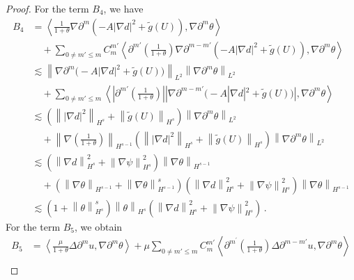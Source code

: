 \documentclass[reqno,11pt]{amsart}
\numberwithin{equation}{section}
\begin{document}
\begin{proof}
For the term $B_4$, we have
\begin{equation}\label{theta-eq5}
\begin{aligned}
B_4 & = \left\langle \frac{1}{1+\theta} \nabla \partial^m \left( - A |\nabla d|^2 + \tilde{g}(U) \right), \nabla \partial^m \theta \right\rangle \\
&\quad  + \sum_{0 \neq m' \leq m} C_m^{m'} \left\langle \partial^{m'} \left( \frac{1}{1+\theta} \right) \nabla \partial^{m - m'} \left( - A |\nabla d|^2 + \tilde{g}(U) \right), \nabla \partial^m \theta \right\rangle\\&
\lesssim \left\|\nabla \partial^m \big(-A|\nabla d|^2 + \tilde{g}(U)\big)\right\|_{L^2} \left\|\nabla \partial^m \theta\right\|_{L^2} \\
&\quad + \sum_{0 \neq m' \leq m} \left\langle \left|\partial^{m'} \left(\frac{1}{1+\theta}\right)\right| |\nabla \partial^{m - m'} \big(-A|\nabla d|^2 + \tilde{g}(U)\big)|, \nabla \partial^m \theta \right\rangle \\
&\lesssim \left( \left\| |\nabla d|^2\right\|_{H^s} + \left\|\tilde{g}(U)\right\|_{H^s} \right) \left\|\nabla \partial^m \theta\right\|_{L^2} \\
&\quad + \left\| \nabla \left(\frac{1}{1+\theta}\right) \right\|_{H^{s-1}} \left( \left\||\nabla d|^2\right\|_{H^s} + \left\|\tilde{g}(U)\right\|_{H^s} \right) \left\|\nabla \partial^m \theta\right\|_{L^2} \\
&\lesssim \left( \left\|\nabla d\right\|_{H^s}^2 + \left\|\nabla \psi\right\|_{H^s}^2 \right) \left\|\nabla \theta\right\|_{H^{s-1}} \\
&\quad + \left( \left\|\nabla \theta\right\|_{H^{s-1}} + \left\|\nabla \theta\right\|_{H^{s-1}}^s \right) \left( \left\|\nabla d\right\|_{H^s}^2 + \left\|\nabla \psi\right\|_{H^s}^2 \right) \left\|\nabla \theta\right\|_{H^{s-1}} \\
&\lesssim \left( 1 + \left\|\theta\right\|_{H^s}^s \right) \left\|\theta\right\|_{H^s} \left( \left\|\nabla d\right\|_{H^s}^2 + \left\|\nabla \psi\right\|_{H^s}^2 \right) \,.
\end{aligned}
\end{equation}
For the term $B_5$, we obtain
\begin{equation}\label{theta-eq6}
\begin{aligned}
B_5 & = \left\langle \frac{\mu}{1+\theta} \Delta \partial^m u, \nabla \partial^m \theta\right\rangle + \mu \sum_{0 \neq m' \leq m} C_m^{m'} \left\langle \partial^{m^\prime} \left( \frac{1}{1+\theta} \right) \Delta \partial^{m-m'} u, \nabla \partial^m \theta\right\rangle \\

\end{aligned}
\end{equation}
\end{proof}
\end{document}
